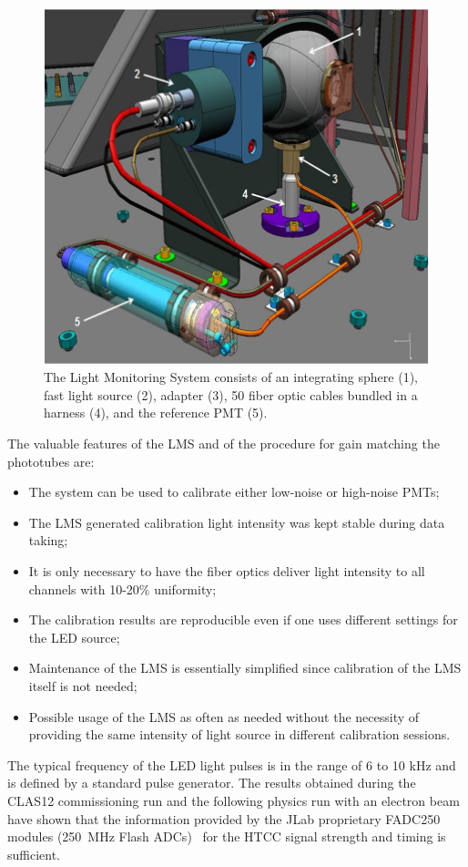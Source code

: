 \begin{figure}[!ht]
    \centering
    \includegraphics[width=1.0\linewidth,trim={0.0cm 0.0cm 0.0cm 0.0cm},clip]{images/LMS_Picture_3.jpg}
    \caption{The Light Monitoring System consists of an integrating sphere (1), fast light source (2), adapter (3),
      50 fiber optic cables bundled in a harness (4), and the reference PMT (5).}
    \label{fig:LMS_Picture_3}
\end{figure} 
 
The valuable features of the LMS and of the procedure for gain matching the phototubes are:
 
 \begin{itemize}
     \item The system can be used to calibrate either low-noise or high-noise PMTs;
     \item The LMS generated calibration light intensity was kept stable during data taking;
     \item It is only necessary to have the fiber optics deliver light intensity to all channels with 10-20\% uniformity;
     \item The calibration results are reproducible even if one uses different settings for the LED source;
     \item Maintenance of the LMS is essentially simplified since calibration of the LMS itself is not needed;
     \item Possible usage of the LMS as often as needed without the necessity of providing the same intensity of light
       source in different calibration sessions.
 \end{itemize}

The typical frequency of the LED light pulses is in the range of 6 to 10 kHz and is defined by a standard pulse
generator. The results obtained during the CLAS12 commissioning run and the following physics run with an
electron beam have shown that the information provided by the JLab proprietary FADC250 modules (250~MHz
Flash ADCs)~\cite{daq-nim} for the HTCC signal strength and timing is sufficient. 

